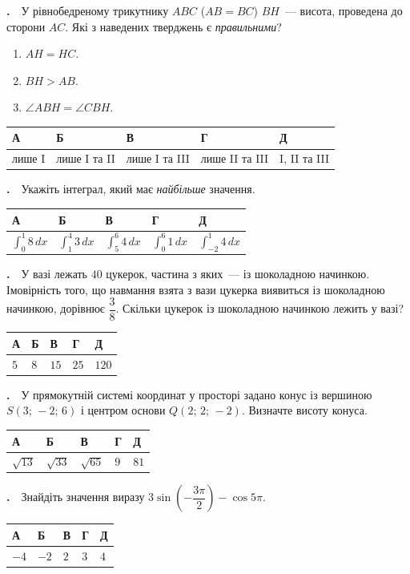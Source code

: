 \documentclass[12pt]{article}
\newlength{\nmtcellw}
\newcommand{\nmtSetCell}{\setlength{\nmtcellw}{\dimexpr(\linewidth-10\tabcolsep-6\arrayrulewidth)/5\relax}}
\newcommand{\answerTable}[5]{%
\par\nopagebreak\vspace{0.15cm}
\noindent\nmtSetCell
\begin{tabular}{|*{5}{>{\centering\arraybackslash}m{\nmtcellw}|}}
\hline
\rule[-0.15cm]{0pt}{0.6cm}\textbf{А} & \rule[-0.15cm]{0pt}{0.6cm}\textbf{Б} & \rule[-0.15cm]{0pt}{0.6cm}\textbf{В} & \rule[-0.15cm]{0pt}{0.6cm}\textbf{Г} & \rule[-0.15cm]{0pt}{0.6cm}\textbf{Д} \\
\hline
\rule[-0.2cm]{0pt}{0.75cm}#1 & \rule[-0.2cm]{0pt}{0.75cm}#2 & \rule[-0.2cm]{0pt}{0.75cm}#3 & \rule[-0.2cm]{0pt}{0.75cm}#4 & \rule[-0.2cm]{0pt}{0.75cm}#5 \\
\hline
\end{tabular}
\par\vspace{0.25cm}
}
\newcommand{\answerTableTall}[5]{%
\par\nopagebreak\vspace{0.15cm}
\noindent\nmtSetCell
\begin{tabular}{|*{5}{>{\centering\arraybackslash}m{\nmtcellw}|}}
\hline
\rule[-0.2cm]{0pt}{0.7cm}\textbf{А} & \rule[-0.2cm]{0pt}{0.7cm}\textbf{Б} & \rule[-0.2cm]{0pt}{0.7cm}\textbf{В} & \rule[-0.2cm]{0pt}{0.7cm}\textbf{Г} & \rule[-0.2cm]{0pt}{0.7cm}\textbf{Д} \\
\hline
\rule[-0.45cm]{0pt}{1.2cm}#1 & \rule[-0.45cm]{0pt}{1.2cm}#2 & \rule[-0.45cm]{0pt}{1.2cm}#3 & \rule[-0.45cm]{0pt}{1.2cm}#4 & \rule[-0.45cm]{0pt}{1.2cm}#5 \\
\hline
\end{tabular}
\par\vspace{0.25cm}
}
\newcounter{zad}
\newcommand{\zadtask}[1]{\stepcounter{zad}\noindent\textbf{\thezad.}\ \ #1\par\nopagebreak\vspace{0.2cm}}
\newcounter{ans}
\newcommand{\nbvspace}[1]{\nopagebreak\vspace{#1}}
\begin{document}
\begin{samepage}
\zadtask{У рівнобедреному трикутнику $ABC$ ($AB = BC$) $BH$~--- висота, проведена до сторони $AC$. Які з наведених тверджень є \textit{правильними}?\par
\nopagebreak\nbvspace{0.1cm}
\begin{enumerate}[label=\textbf{\Roman*.}, align=left, leftmargin=2.6em, labelsep=0.5em, itemsep=2pt, topsep=2pt]
\item $AH = HC$.
\item $BH > AB$.
\item $\angle ABH = \angle CBH$.
\end{enumerate}
\nopagebreak\nbvspace{0.1cm}}
\answerTable{лише I}{лише I та II}{лише I та III}{лише II та III}{I, II та III}
\par{}
\end{samepage}

\begin{samepage}
\zadtask{Укажіть інтеграл, який має \textit{найбільше} значення.}
\answerTableTall{$\displaystyle\int_0^1 8\,dx$}{$\displaystyle\int_1^4 3\,dx$}{$\displaystyle\int_5^6 4\,dx$}{$\displaystyle\int_0^6 1\,dx$}{$\displaystyle\int_{-2}^{1} 4\,dx$}
\par{}
\end{samepage}

\begin{samepage}
\zadtask{У вазі лежать $40$ цукерок, частина з яких~--- із шоколадною начинкою. Імовірність того, що навмання взята з вази цукерка виявиться із шоколадною начинкою, дорівнює $\dfrac38$. Скільки цукерок із шоколадною начинкою лежить у вазі?}
\answerTable{$5$}{$8$}{$15$}{$25$}{$120$}
\par{}
\end{samepage}

\begin{samepage}
\zadtask{У прямокутній системі координат у просторі задано конус із вершиною $S(3;\, -2;\, 6)$ і центром основи $Q(2;\, 2;\, -2)$. Визначте висоту конуса.}
\answerTable{$\sqrt{13}$}{$\sqrt{33}$}{$\sqrt{65}$}{$9$}{$81$}
\par{}
\end{samepage}

\begin{samepage}
\zadtask{Знайдіть значення виразу $3\sin\left(-\dfrac{3\pi}{2}\right) - \cos 5\pi$.}
\answerTable{$-4$}{$-2$}{$2$}{$3$}{$4$}
\par{}
\end{samepage}
\end{document}
